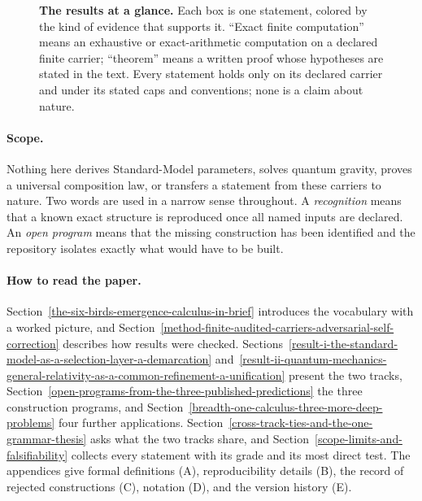 \documentclass[11pt]{article}
\theoremstyle{definition}
\begin{document}
\begin{figure}[tbp]
\caption{\textbf{The results at a glance.} Each box is one statement, colored by the kind of evidence that supports
it. ``Exact finite computation'' means an exhaustive or exact-arithmetic computation on a declared finite carrier;
``theorem'' means a written proof whose hypotheses are stated in the text. Every statement holds only on its declared
carrier and under its stated caps and conventions; none is a claim about nature.}
\label{fig:overview}
\end{figure}
 
\paragraph{Scope.} Nothing here derives Standard-Model parameters, solves quantum gravity, proves a universal
composition law, or transfers a statement from these carriers to nature. Two words are used in a narrow sense
throughout. A \emph{recognition} means that a known exact structure is reproduced once all named inputs are declared.
An \emph{open program} means that the missing construction has been identified and the repository isolates exactly
what would have to be built.

\paragraph{How to read the paper.} Section~\ref{the-six-birds-emergence-calculus-in-brief} introduces the vocabulary
with a worked picture, and Section~\ref{method-finite-audited-carriers-adversarial-self-correction} describes how
results were checked. Sections~\ref{result-i-the-standard-model-as-a-selection-layer-a-demarcation}
and~\ref{result-ii-quantum-mechanics-general-relativity-as-a-common-refinement-a-unification} present the two tracks,
Section~\ref{open-programs-from-the-three-published-predictions} the three construction programs, and
Section~\ref{breadth-one-calculus-three-more-deep-problems} four further applications.
Section~\ref{cross-track-ties-and-the-one-grammar-thesis} asks what the two tracks share, and
Section~\ref{scope-limits-and-falsifiability} collects every statement with its grade and its most direct test. The
appendices give formal definitions (A), reproducibility details (B), the record of rejected constructions (C),
notation (D), and the version history (E).
\end{document}
